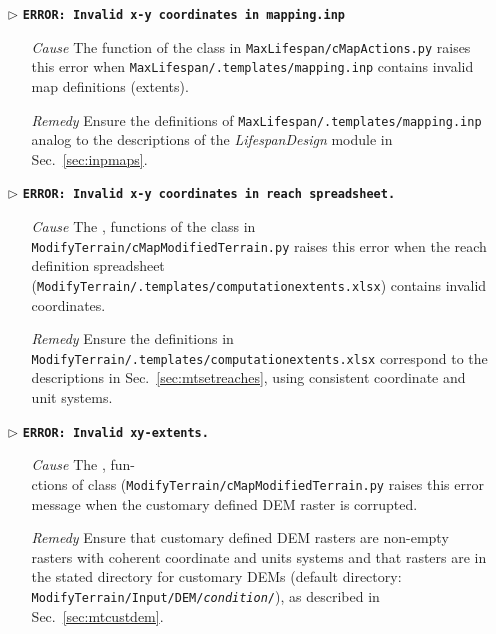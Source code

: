 \begin{itemize}
	\item[$\triangleright$]\textbf{\texttt{ERROR: Invalid x-y coordinates in mapping.inp}}
	\begin{itemize}
		\item[\textit{Cause}\hspace{0.27cm}] The  function of the  class in \texttt{MaxLifespan/cMapActions.py} raises this error when \texttt{MaxLifespan/.templates/mapping.inp} contains invalid map definitions (extents).
		\item[\textit{Remedy}] Ensure the definitions of \texttt{MaxLifespan/.templates/mapping.inp} analog to the descriptions of the \textit{LifespanDesign} module in Sec.~\ref{sec:inpmaps}.\\
	\end{itemize}
	
	\item[$\triangleright$]\textbf{\texttt{ERROR: Invalid x-y coordinates in reach spreadsheet.}}
	\begin{itemize}
		\item[\textit{Cause}\hspace{0.27cm}] The ,  functions of the  class in \texttt{ModifyTerrain/cMapModifiedTerrain.py} raises this error when the reach definition spreadsheet (\texttt{ModifyTerrain/.templates/computation{\myUnderscore}extents.xlsx}) contains invalid coordinates.
		\item[\textit{Remedy}] Ensure the definitions in \texttt{ModifyTerrain/.templates/computation{\myUnderscore}extents.xlsx} correspond to the descriptions in Sec.~\ref{sec:mtsetreaches}, using consistent coordinate and unit systems.\\
	\end{itemize}
	
	\item[$\triangleright$]\textbf{\texttt{ERROR: Invalid xy-extents.}}
	\begin{itemize}
		\item[\textit{Cause}\hspace{0.27cm}] The ,  fun-\\ctions of  class (\texttt{ModifyTerrain/cMapModifiedTerrain.py} raises this error message when the customary defined DEM raster is corrupted.
		\item[\textit{Remedy}] Ensure that customary defined DEM rasters are non-empty rasters with coherent coordinate and units systems and that rasters are in the stated directory for customary DEMs (default directory: \texttt{ModifyTerrain/Input/DEM/\textit{condition}/}), as described in Sec.~\ref{sec:mtcustdem}.\\
	\end{itemize}
	

\end{itemize}

